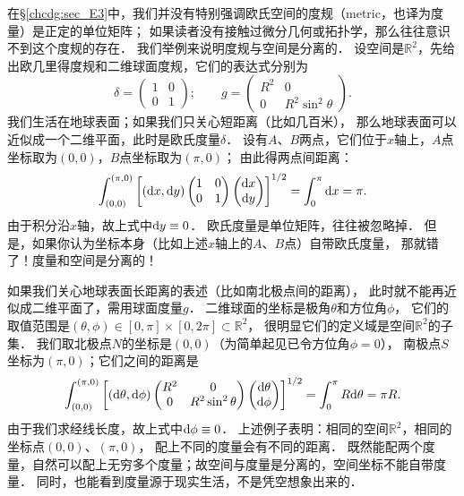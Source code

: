 在\S\ref{chcdg:sec_E3}中，我们并没有特别强调欧氏空间的度规（metric，也译为度量）是正定的单位矩阵；
如果读者没有接触过微分几何或拓扑学，那么往往意识不到这个度规的存在．
我们举例来说明度规与空间是分离的．
设空间是$\mathbb{R}^2$，先给出欧几里得度规和二维球面度规，它们的表达式分别为
\begin{equation}
    \delta=\begin{pmatrix}  
        1 &0 \\ 0& 1   
    \end{pmatrix};  \qquad
    g=\begin{pmatrix}  
        R^2 & 0 \\ 0 & R^2 \sin^2\theta  
    \end{pmatrix} .
\end{equation}
我们生活在地球表面；如果我们只关心短距离（比如几百米），
那么地球表面可以近似成一个二维平面，此时是欧氏度量$\delta$．
设有$A$、$B$两点，它们位于$x$轴上，$A$点坐标取为$(0,0)$，$B$点坐标取为$(\pi,0)$；
由此得两点间距离：
\begin{equation}
    \int_{(0,0)}^{(\pi,0)} {\left[({\rm d}x,{\rm d}y)\begin{pmatrix}  
        1 &0 \\ 0& 1   
    \end{pmatrix}
    \begin{pmatrix}  
        {\rm d}x \\ {\rm d}y   
    \end{pmatrix}\right]^{1/2}}
    =\int_{0}^{\pi} {\rm d}x =\pi.
\end{equation}
由于积分沿$x$轴，故上式中${\rm d}y\equiv 0$．
欧氏度量是单位矩阵，往往被忽略掉．
但是，如果你认为坐标本身（比如上述$x$轴上的$A$、$B$点）自带欧氏度量，
那就错了！度量和空间是分离的！

如果我们关心地球表面长距离的表述（比如南北极点间的距离），
此时就不能再近似成二维平面了，需用球面度量$g$．
二维球面的坐标是极角$\theta$和方位角$\phi$，
它们的取值范围是$(\theta,\phi)\in [0,\pi]\times[0,2\pi]\subset \mathbb{R}^2$，
很明显它们的定义域是空间$\mathbb{R}^2$的子集．
我们取北极点$N$的坐标是$(0,0)$（为简单起见已令方位角$\phi=0$），
南极点$S$坐标为$(\pi,0)$；它们之间的距离是
\begin{equation}
    \int_{(0,0)}^{(\pi,0)} \left[({\rm d}\theta ,{\rm d}\phi)\begin{pmatrix}  
        R^2 & 0 \\ 0 & R^2 \sin^2\theta  
    \end{pmatrix}
    \begin{pmatrix}  
        {\rm d}\theta  \\ {\rm d}\phi
    \end{pmatrix}\right]^{1/2}
    =\int_{0}^{\pi}R {\rm d}\theta=\pi R.
\end{equation}
由于我们求经线长度，故上式中${\rm d}\phi \equiv 0$．
上述例子表明：相同的空间$\mathbb{R}^2$，相同的坐标点$(0,0)$、$(\pi,0)$，
配上不同的度量会有不同的距离．
既然能配两个度量，自然可以配上无穷多个度量；故空间与度量是分离的，空间坐标不能自带度量．
同时，也能看到度量源于现实生活，不是凭空想象出来的．


